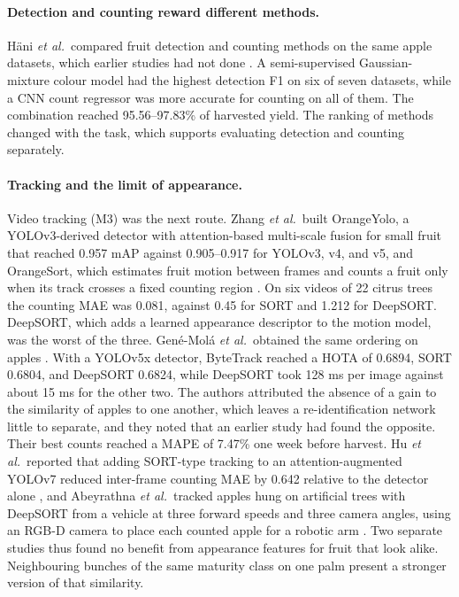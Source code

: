 \paragraph{Detection and counting reward different methods.} H\"ani \textit{et al.}\ compared fruit detection and counting methods on the same apple datasets, which earlier studies had not done \cite{ledger_r_1358c0868a62c84a}. A semi-supervised Gaussian-mixture colour model had the highest detection F1 on six of seven datasets, while a CNN count regressor was more accurate for counting on all of them. The combination reached 95.56--97.83\% of harvested yield. The ranking of methods changed with the task, which supports evaluating detection and counting separately.

\paragraph{Tracking and the limit of appearance.} Video tracking (M3) was the next route. Zhang \textit{et al.}\ built OrangeYolo, a YOLOv3-derived detector with attention-based multi-scale fusion for small fruit that reached 0.957 mAP against 0.905--0.917 for YOLOv3, v4, and v5, and OrangeSort, which estimates fruit motion between frames and counts a fruit only when its track crosses a fixed counting region \cite{ledger_r_ee550a3e3a6fb318}. On six videos of 22 citrus trees the counting MAE was 0.081, against 0.45 for SORT and 1.212 for DeepSORT. DeepSORT, which adds a learned appearance descriptor to the motion model, was the worst of the three. Gené-Molá \textit{et al.}\ obtained the same ordering on apples \cite{ledger_r_2d972b94554c6cd1}. With a YOLOv5x detector, ByteTrack reached a HOTA of 0.6894, SORT 0.6804, and DeepSORT 0.6824, while DeepSORT took 128 ms per image against about 15 ms for the other two. The authors attributed the absence of a gain to the similarity of apples to one another, which leaves a re-identification network little to separate, and they noted that an earlier study had found the opposite. Their best counts reached a MAPE of 7.47\% one week before harvest. Hu \textit{et al.}\ reported that adding SORT-type tracking to an attention-augmented YOLOv7 reduced inter-frame counting MAE by 0.642 relative to the detector alone \cite{ledger_r_d594d85dc382f9ff}, and Abeyrathna \textit{et al.}\ tracked apples hung on artificial trees with DeepSORT from a vehicle at three forward speeds and three camera angles, using an RGB-D camera to place each counted apple for a robotic arm \cite{ledger_r_9e1316b934e66409}. Two separate studies thus found no benefit from appearance features for fruit that look alike. Neighbouring bunches of the same maturity class on one palm present a stronger version of that similarity.

